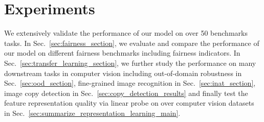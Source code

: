 \documentclass[10pt,twocolumn,letterpaper]{article}
\begin{document}
\section{Experiments}
We extensively validate the performance of our model on over 50 benchmarks tasks. In Sec.~\ref{sec:fairness_section}, we evaluate and compare the performance of our model on  different fairness benchmarks including  fairness indicators. In Sec.~\ref{sec:transfer_learning_section}, we further study the performance on many downstream tasks in computer vision including out-of-domain robustness in Sec.~\ref{sec:ood_section}, fine-grained image recognition in Sec.~\ref{sec:inat_section}, image copy detection in Sec.~\ref{sec:copy_detection_results} and finally test the feature representation quality via linear probe on over  computer vision datasets in Sec.~\ref{sec:summarize_representation_learning_main}.
\end{document}
